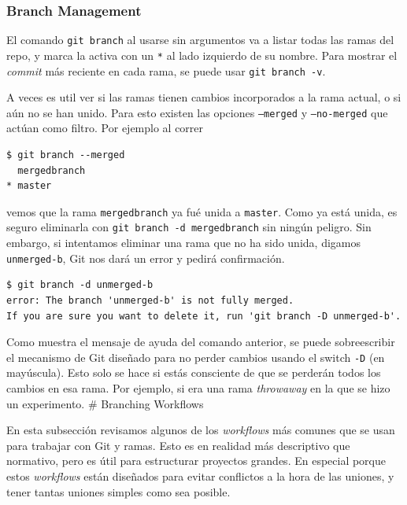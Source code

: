 \documentclass[spanish, 12pt, a4paper]{article}
\begin{document}
\subsubsection{Branch Management}

El comando \passthrough{\lstinline!git branch!} al usarse sin argumentos
va a listar todas las ramas del repo, y marca la activa con un
\passthrough{\lstinline!*!} al lado izquierdo de su nombre. Para mostrar
el \emph{commit} más reciente en cada rama, se puede usar
\passthrough{\lstinline!git branch -v!}.

A veces es util ver si las ramas tienen cambios incorporados a la rama
actual, o si aún no se han unido. Para esto existen las opciones
\passthrough{\lstinline!–merged!} y \passthrough{\lstinline!–no-merged!}
que actúan como filtro. Por ejemplo al correr

\begin{lstlisting}
$ git branch --merged
  mergedbranch
* master
\end{lstlisting}

vemos que la rama \passthrough{\lstinline!mergedbranch!} ya fué unida a
\passthrough{\lstinline!master!}. Como ya está unida, es seguro
eliminarla con \passthrough{\lstinline!git branch -d mergedbranch!} sin
ningún peligro. Sin embargo, si intentamos eliminar una rama que no ha
sido unida, digamos \passthrough{\lstinline!unmerged-b!}, Git nos dará
un error y pedirá confirmación.

\begin{lstlisting}
$ git branch -d unmerged-b
error: The branch 'unmerged-b' is not fully merged.
If you are sure you want to delete it, run 'git branch -D unmerged-b'.
\end{lstlisting}

Como muestra el mensaje de ayuda del comando anterior, se puede
sobreescribir el mecanismo de Git diseñado para no perder cambios usando
el switch \passthrough{\lstinline!-D!} (en mayúscula). Esto solo se hace
si estás consciente de que se perderán todos los cambios en esa rama.
Por ejemplo, si era una rama \emph{throwaway} en la que se hizo un
experimento. \# Branching Workflows

En esta subsección revisamos algunos de los \emph{workflows} más comunes
que se usan para trabajar con Git y ramas. Esto es en realidad más
descriptivo que normativo, pero es útil para estructurar proyectos
grandes. En especial porque estos \emph{workflows} están diseñados para
evitar conflictos a la hora de las uniones, y tener tantas uniones
simples como sea posible.
\end{document}
